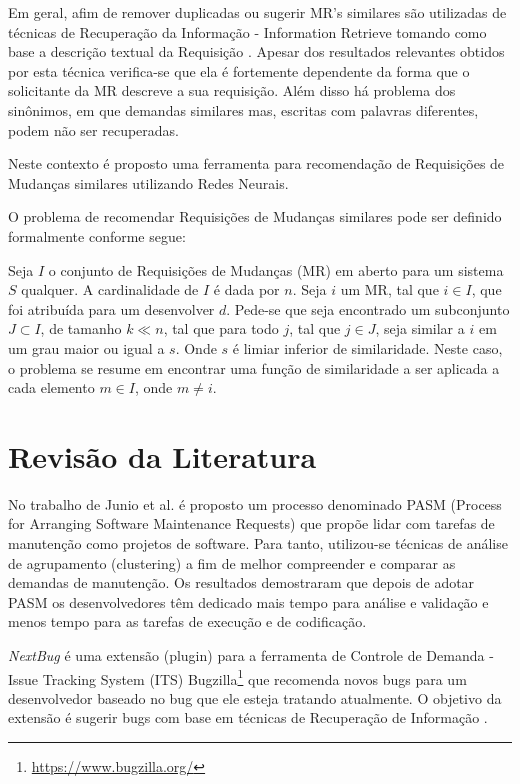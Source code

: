 \documentclass[msc,proposal,hidelot,hideabstract]{ppgccufmg} %
\begin{document}
Em geral, afim de remover duplicadas ou sugerir MR's similares são utilizadas de
técnicas de Recuperação da Informação - Information Retrieve
\cite{baeza1999modern} tomando como base a descrição textual da Requisição \cite{101186,Runeson:2007:DDD:1248820.1248882}. Apesar dos resultados
relevantes obtidos por esta técnica verifica-se que ela é fortemente
dependente da forma que o solicitante da MR descreve a sua requisição. Além disso
há problema dos sinônimos, em que demandas similares mas, escritas com palavras
diferentes, podem não ser recuperadas.

Neste contexto é proposto uma ferramenta para recomendação de Requisições de
Mudanças similares utilizando Redes Neurais.

O problema de recomendar Requisições de Mudanças similares pode ser definido
formalmente conforme segue:

Seja $I$ o conjunto de Requisições de Mudanças (MR) em aberto para um
sistema $S$ qualquer. A cardinalidade de $I$ é dada por $n$. Seja $i$ um MR,
tal que $i \in I$, que foi atribuída para um desenvolver
$d$. Pede-se que seja encontrado um subconjunto $J \subset I$, de tamanho $k \ll n$, tal
que para todo $j$, tal que $j \in J$, seja similar a $i$ em um grau maior ou igual a
$s$. Onde $s$ é limiar inferior de similaridade. Neste caso, o problema se resume em
encontrar uma função de similaridade a ser aplicada a cada elemento $m \in I$,
onde $m \neq i$.

\chapter{Revisão da Literatura}
\label{ch:revisao}

No trabalho de Junio et al. \cite{5741246} é proposto um processo denominado PASM (Process for Arranging
Software Maintenance Requests) que propõe lidar com tarefas de manutenção como
projetos de software. Para tanto, utilizou-se técnicas de análise de
agrupamento (clustering) a fim de melhor compreender e comparar as demandas de
manutenção. Os resultados demostraram que depois de adotar PASM os
desenvolvedores têm dedicado mais tempo para análise e validação e menos tempo
para as tarefas de execução e de codificação.

\textit{NextBug} \cite{101186} é uma extensão (plugin) para a ferramenta de Controle de Demanda -
Issue Tracking System (ITS) Bugzilla\footnote{\url{https://www.bugzilla.org/}}
que recomenda novos bugs para um desenvolvedor baseado no bug que ele esteja
tratando atualmente. O objetivo da extensão é sugerir bugs com base em técnicas de
Recuperação de Informação \cite{baeza1999modern}.
\end{document}
